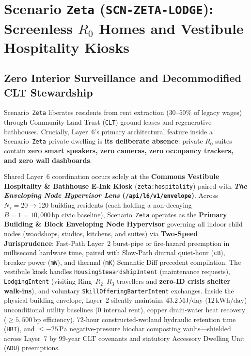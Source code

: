 \section{Scenario \texttt{Zeta} (\texttt{SCN-ZETA-LODGE}): Screenless $R_0$ Homes and Vestibule Hospitality Kiosks}
\label{sec:wave-c-zeta}

\subsection{Zero Interior Surveillance and Decommodified CLT Stewardship}

Scenario~\texttt{Zeta} liberates residents from rent extraction ($30\text{--}50\%$ of legacy wages) through Community Land Trust (\texttt{CLT}) ground leases and regenerative bathhouses. Crucially, Layer~6's primary architectural feature inside a Scenario~\texttt{Zeta} private dwelling is \textbf{its deliberate absence}: private $R_0$ suites contain \textbf{zero smart speakers, zero cameras, zero occupancy trackers, and zero wall dashboards}.

Shared Layer~6 coordination occurs solely at the \textbf{Commons Vestibule Hospitality \& Bathhouse E-Ink Kiosk} (\texttt{zeta:hospitality}) paired with \textbf{\textit{The Enveloping Node Hypervisor Lens} (\texttt{/api/l6/v1/envelope})}. Across $N_s = 20 \to 120$ building residents (each holding a non-decaying $B = 1 = 10{,}000\,\mathrm{bp}$ civic baseline), Scenario~\texttt{Zeta} operates as the \textbf{Primary Building \& Block Enveloping Node Hypervisor} governing all indoor child nodes (woodshops, studios, kitchens, and suites) via \textbf{Two-Speed Jurisprudence}: Fast-Path Layer~2 burst-pipe or fire-hazard preemption in millisecond hardware time, paired with Slow-Path diurnal quiet-hour (\texttt{cB}), breaker power (\texttt{mW}), and thermal (\texttt{mK}) Semantic Diff precedent compilation. The vestibule kiosk handles \texttt{HousingStewardshipIntent} (maintenance requests), \texttt{LodgingIntent} (visiting Ring~$R_2\text{--}R_3$ travellers and \textbf{zero-ID crisis shelter walk-ins}), and voluntary \texttt{SkillOfferingBarterIntent} exchanges. Inside the physical building envelope, Layer~2 silently maintains $43.2\,\mathrm{MJ/day}$ ($12\,\mathrm{kWh/day}$) unconditional utility baselines ($0$ internal rent), copper drain-water heat recovery ($\ge 5{,}500\,\mathrm{bp}$ efficiency), $72$-hour constructed-wetland hydraulic retention time (\texttt{HRT}), and $\le -25\,\mathrm{Pa}$ negative-pressure biochar composting vaults---shielded across Layer~7 by 99-year CLT covenants and statutory Accessory Dwelling Unit (\texttt{ADU}) preemptions.

